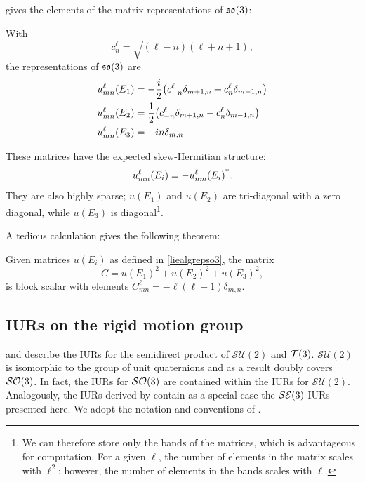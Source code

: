 \documentclass[../../main.tex]{subfiles}
\begin{document}
\begin{refsection}
	\cite[Section 12.9]{chirikjianStochasticModelsInformation2012} gives the elements of the matrix representations of $\mathfrak{so} (3)$:
	\begin{theorem} \label{liealgrepso3}
		With
		$$c^\ell_n = \sqrt{(\ell - n)(\ell + n + 1)},$$
		the representations of $\mathfrak{so} (3)$ are
		\begin{align*}
			u^\ell_{mn}(E_1) & = -\frac{i}{2} \qty(c^\ell_{-n} \delta_{m+1,n} + c^\ell_n \delta_{m-1,n}) \\
			u^\ell_{mn}(E_2) & = \frac{1}{2} \qty(c^\ell_{-n} \delta_{m+1,n} - c^\ell_n \delta_{m-1,n})    \\
			u^\ell_{mn}(E_3) & = -i n \delta_{m,n}
		\end{align*}
	\end{theorem}

	These matrices have the expected skew-Hermitian structure:
	$$u^\ell_{mn}(E_i) = -{u^\ell_{nm}(E_i)}^*.$$
	They are also highly sparse;
	$u(E_1)$ and $u(E_2)$ are tri-diagonal with a zero diagonal, while $u(E_3)$ is diagonal\footnote{
		We can therefore store only the bands of the matrices, which is advantageous for computation.
		For a given $\ell$, the number of elements in the matrix scales with $\ell^2$; however, the number of elements in the bands scales with $\ell$.
	}.

	A tedious calculation gives the following theorem:
	\begin{theorem}\label{square_so3_iur_is_scalar}
		Given matrices $u(E_i)$ as defined in \cref{liealgrepso3}, the matrix
		$$C = u(E_1)^2 + u(E_2)^2 + u(E_3)^2,$$
		is block scalar with elements $C^\ell_{mn} = -\ell (\ell + 1) \delta_{m,n}$.
	\end{theorem}

	\subsection{IURs on the rigid motion group}

	\cite{millerApplicationsRepresentationTheory1964} and \cite[Chapter 6]{millerLieTheorySpecial1968} describe the IURs for the semidirect product of $\mathcal{SU}(2)$ and $\mathcal{T} (3)$.
	$\mathcal{SU}(2)$ is isomorphic to the group of unit quaternions and as a result doubly covers $\mathcal{SO} (3)$.
	In fact, the IURs for $\mathcal{SO} (3)$ are contained within the IURs for $\mathcal{SU}(2)$.
	Analogously, the IURs derived by \cite{millerApplicationsRepresentationTheory1964} contain as a special case the $\mathcal{SE} (3)$ IURs presented here.
	We adopt the notation and conventions of \cite[Section 10.7]{chirikjianHarmonicAnalysisEngineers2016}.


\end{refsection}
\end{document}
